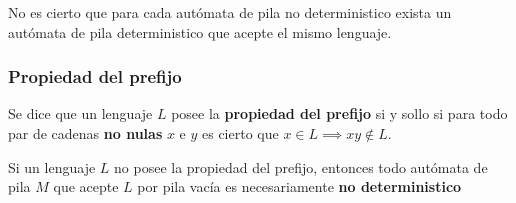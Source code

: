 No es cierto que para cada autómata de pila no deterministico exista un autómata de pila deterministico que acepte el mismo lenguaje.

\subsubsection{Propiedad del prefijo}
Se dice que un lenguaje \(L\) posee la \textbf{propiedad del prefijo} si y sollo si para todo par de cadenas \textbf{no nulas} \(x\) e \(y\) es cierto que \(x \in L \implies xy\notin L\).

Si un lenguaje \(L\) no posee la propiedad del prefijo, entonces todo autómata de pila \(M\) que acepte \(L\) por pila vacía es necesariamente \textbf{no deterministico}